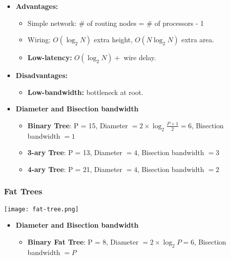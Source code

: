 \documentclass[../main.tex]{subfiles}
\begin{document}
\begin{multicols}{2}

\begin{itemize}
	\item \textbf{Advantages:}
	      \begin{itemize}
		      \item Simple network: \# of routing nodes = \# of processors - 1
		      \item Wiring: \(O(\log_2{N})\) extra height, \(O(N\log_2{N})\) extra area.
		      \item \textbf{Low-latency:} \(O(\log_2{N}) +\) wire delay.
	      \end{itemize}
	\item \textbf{Disadvantages:}
	      \begin{itemize}
		      \item \textbf{Low-bandwidth:} bottleneck at root.
	      \end{itemize}
\end{itemize}

\begin{itemize}

	\item \textbf{Diameter and Bisection bandwidth}
	      \begin{itemize}
		      \item \textbf{Binary Tree}: P = 15, Diameter \(= 2\times \log_2{\frac{P+1}{2}} = 6\), Bisection bandwidth \(= 1\)
		      \item \textbf{3-ary Tree}: P = 13, Diameter \(= 4\), Bisection bandwidth \(= 3\)
		      \item \textbf{4-ary Tree}: P = 21, Diameter \(= 4\), Bisection bandwidth \(= 2\)
\end{itemize}

\end{itemize}

\end{multicols}

\subsubsection{Fat Trees}


\begin{center}
	\texttt{[image: fat-tree.png]}
\end{center}

\begin{itemize}
	\item \textbf{Diameter and Bisection bandwidth}
	      \begin{itemize}
		      \item \textbf{Binary Fat Tree}: P = 8, Diameter \(= 2\times \log_2{P} = 6\), Bisection bandwidth \(= P\)
	      \end{itemize}
\end{itemize}

\end{document}
